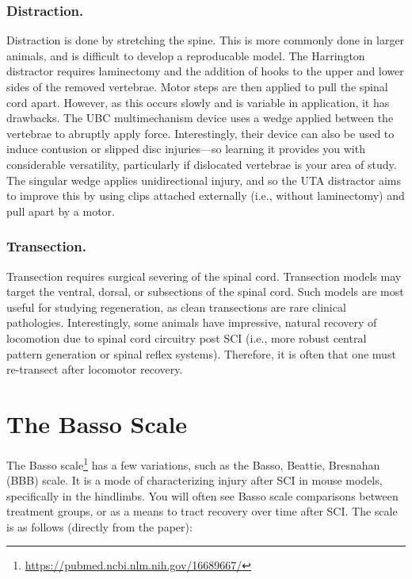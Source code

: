 \documentclass[12pt]{report}
\begin{document}
\subsubsection{Distraction.}
Distraction is done by stretching the spine. This is more commonly done in larger animals, and is difficult to develop a reproducable model. The Harrington distractor requires laminectomy and the addition of hooks to the upper and lower sides of the removed vertebrae. Motor steps are then applied to pull the spinal cord apart. However, as this occurs slowly and is variable in application, it has drawbacks. The UBC multimechanism device uses a wedge applied between the vertebrae to abruptly apply force. Interestingly, their device can also be used to induce contusion or slipped disc injuries---so learning it provides you with considerable versatility, particularly if dislocated vertebrae is your area of study. The singular wedge applies unidirectional injury, and so the UTA distractor aims to improve this by using clips attached externally (i.e., without laminectomy) and pull apart by a motor. 

\subsubsection{Transection.}
Transection requires surgical severing of the spinal cord. Transection models may target the ventral, dorsal, or subsections of the spinal cord. Such models are most useful for studying regeneration, as clean transections are rare clinical pathologies. Interestingly, some animals have impressive, natural recovery of locomotion due to spinal cord circuitry post SCI (i.e., more robust central pattern generation or spinal reflex systems). Therefore, it is often that one must re-transect after locomotor recovery. 

\section{The Basso Scale}

The Basso scale\footnote{\url{https://pubmed.ncbi.nlm.nih.gov/16689667/}} has a few variations, such as the Basso, Beattie, Bresnahan (BBB) scale. It is a mode of characterizing injury after SCI in mouse models, specifically in the hindlimbs. You will often see Basso scale comparisons between treatment groups, or as a means to tract recovery over time after SCI. The scale is as follows (directly from the paper): 
\end{document}
